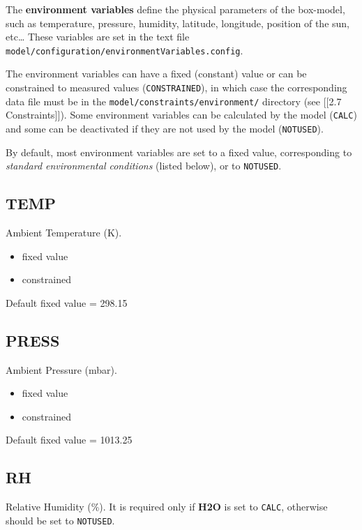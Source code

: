 The \textbf{environment variables} define the physical parameters of the
box-model, such as temperature, pressure, humidity, latitude, longitude,
position of the sun, etc\ldots{} These variables are set in the text
file \texttt{model/configuration/environmentVariables.config}.

The environment variables can have a fixed (constant) value or can be
constrained to measured values (\texttt{CONSTRAINED}), in which case the
corresponding data file must be in the
\texttt{model/constraints/environment/} directory (see {[}{[}2.7
Constraints{]}{]}). Some environment variables can be calculated by the
model (\texttt{CALC}) and some can be deactivated if they are not used
by the model (\texttt{NOTUSED}).

By default, most environment variables are set to a fixed value,
corresponding to \emph{standard environmental conditions} (listed
below), or to \texttt{NOTUSED}.

\hypertarget{temp}{%
\subsection{TEMP}\label{temp}}

Ambient Temperature (K).

\begin{itemize}
\tightlist
\item
  fixed value
\item
  constrained
\end{itemize}

Default fixed value = 298.15

\hypertarget{press}{%
\subsection{PRESS}\label{press}}

Ambient Pressure (mbar).

\begin{itemize}
\tightlist
\item
  fixed value
\item
  constrained
\end{itemize}

Default fixed value = 1013.25

\hypertarget{rh}{%
\subsection{RH}\label{rh}}

Relative Humidity (\%). It is required only if \textbf{H2O} is set to
\texttt{CALC}, otherwise should be set to \texttt{NOTUSED}.

